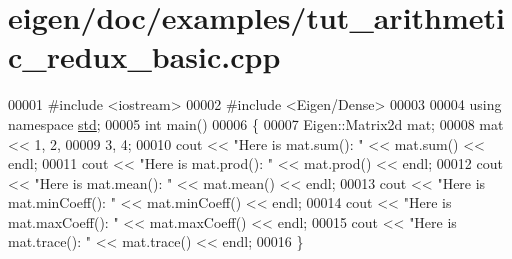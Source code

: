 \hypertarget{eigen_2doc_2examples_2tut__arithmetic__redux__basic_8cpp_source}{}\section{eigen/doc/examples/tut\+\_\+arithmetic\+\_\+redux\+\_\+basic.cpp}
\label{eigen_2doc_2examples_2tut__arithmetic__redux__basic_8cpp_source}

\begin{DoxyCode}
00001 \textcolor{preprocessor}{#include <iostream>}
00002 \textcolor{preprocessor}{#include <Eigen/Dense>}
00003 
00004 \textcolor{keyword}{using namespace }\hyperlink{namespacestd}{std};
00005 \textcolor{keywordtype}{int} main()
00006 \{
00007   Eigen::Matrix2d mat;
00008   mat << 1, 2,
00009          3, 4;
00010   cout << \textcolor{stringliteral}{"Here is mat.sum():       "} << mat.sum()       << endl;
00011   cout << \textcolor{stringliteral}{"Here is mat.prod():      "} << mat.prod()      << endl;
00012   cout << \textcolor{stringliteral}{"Here is mat.mean():      "} << mat.mean()      << endl;
00013   cout << \textcolor{stringliteral}{"Here is mat.minCoeff():  "} << mat.minCoeff()  << endl;
00014   cout << \textcolor{stringliteral}{"Here is mat.maxCoeff():  "} << mat.maxCoeff()  << endl;
00015   cout << \textcolor{stringliteral}{"Here is mat.trace():     "} << mat.trace()     << endl;
00016 \}
\end{DoxyCode}
